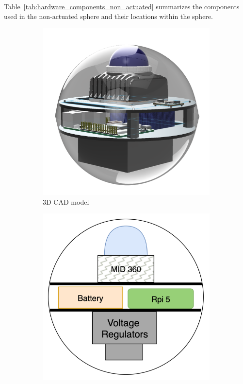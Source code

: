 \documentclass[english, bachelor, utf8]{base/thesis_telematics}
\begin{document}
Table~\ref{tab:hardware_components_non_actuated} summarizes the components used in the non-actuated sphere and their locations within the sphere.
\begin{figure}
\centering
\begin{subfigure}{0.4\columnwidth}
    \centering
    \includegraphics[width=\textwidth]{pics/Non_actuated_Sphere_CAD.png}
    \caption{3D CAD model}
    \label{fig:cad-model}
\end{subfigure}
\hfill
\begin{subfigure}{0.4\columnwidth}
    \centering
    \includegraphics[width=\textwidth]{pics/image.png}

\end{subfigure}
\end{figure}
\end{document}

